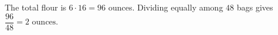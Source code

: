 The total flour is $6\cdot16=96$ ounces. Dividing equally among $48$ bags gives $\boxed{\dfrac{96}{48}=2\text{ ounces}}$.
